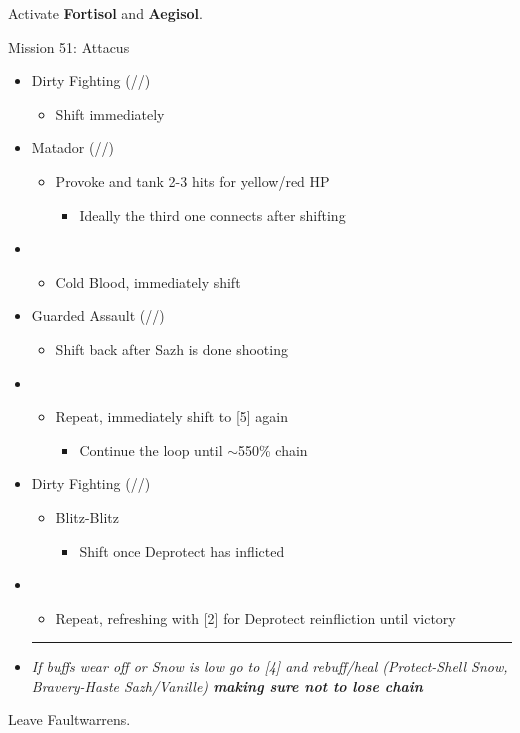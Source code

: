 \renewcommand{\second}{[2] Dirty Fighting (\com/\sen/\sab)}
\renewcommand{\fourth}{[4] Protection (\syn/\sen/\med)}
\renewcommand{\fifth}{[5] Guarded Assault (\sen/\sen/\com)}
\renewcommand{\sixth}{[6] Matador (\sen/\rav/\sab)}

Activate \textbf{Fortisol} and \textbf{Aegisol}.
\vfill

\begin{battle}{Mission 51: Attacus}
	\begin{itemize}
		\item \second
			\begin{itemize}
				\item Shift immediately
			\end{itemize}
		\item \sixth
			\begin{itemize}
				\item Provoke and tank 2-3 hits for yellow/red HP
					\begin{itemize}
						\item Ideally the third one connects after shifting
					\end{itemize}
			\end{itemize}
		\item \third
			\begin{itemize}
				\item Cold Blood, immediately shift
			\end{itemize}
		\item \fifth
			\begin{itemize}
				\item Shift back after Sazh is done shooting
			\end{itemize}
		\item \third
			\begin{itemize}
				\item Repeat, immediately shift to [5] again
					\begin{itemize}
						\item Continue the loop until $\sim$550\% chain
					\end{itemize}
			\end{itemize}
		\item \second
			\begin{itemize}
				\item Blitz-Blitz
					\begin{itemize}
						\item Shift once Deprotect has inflicted
					\end{itemize}
			\end{itemize}
		\item \first
			\begin{itemize}
				\item Repeat, refreshing with [2] for Deprotect reinfliction until victory
			\end{itemize}
		\rule{.9\columnwidth}{1pt}
		\item \textit{ If buffs wear off or Snow is low go to [4] and rebuff/heal (Protect-Shell Snow, Bravery-Haste Sazh/Vanille) \textbf{making sure not to lose chain}}
	\end{itemize}
\end{battle}

Leave Faultwarrens.
\vfill
